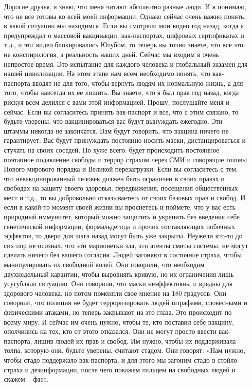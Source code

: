Дорогие друзья, я знаю, что меня читают абсолютно разные люди. И я понимаю, что не все готовы ко всей моей информации. Однако сейчас очень важно понять, в какой ситуации мы находимся. Если вы смотрели мои видео год назад, когда я предупреждал о массовой вакцинации, вак-паспортах, цифровых сертификатах и т.д., и эти видео блокировались Ютубом, то теперь вы точно знаете, что все это не конспирология, а реальность наших дней. 
Сейчас мы входим в очень непростое время. Это испытание для каждого человека и глобальный экзамен для нашей цивилизации.
На этом этапе нам всем необходимо понять, что вак-паспорта вводят не для того, чтобы вернуть людям их нормальную жизнь, а для того, чтобы навсегда их ее лишить.
Вы знаете, что я был прав год назад, когда рискуя всем делился с вами этой информацией. Прошу, послушайте меня и сейчас. 
Если вы согласитесь принять вак-паспорт и все, что с этим связано, то будьте уверены, что вакцинироваться вас будут вынуждать ежегодно. Эти штаммы никогда не закончатся. Вам будут говорить, что вакцина ничего не гарантирует. Вас будут принуждать постоянно носить маски, дистанцироваться и стучать на своих соседей. Но хуже всего: будет происходить постоянное поэтапное подавление свободы и террор страхом через СМИ и говорящие головы Нового мирового порядка и Великой перезагрузки. 
Если вы согласитесь с тем, что невакцинированный человек должен быть ограничен в своих правах и свободах на защиту своего здоровья, передвижения, посещения общественных мест и т.д., то вы добровольно отказываетесь от своих базовых прав и свобод. И если в какой-то момент своей жизни вы проснетесь и поймете, что у вас есть природный иммунитет, который можно защитить и укрепить без введения себе генетической информации, формальдегида и прочих составляющих побочных эффектов, то двери для шага назад могут быть уже закрыты.
Неужели кто-то до сих пор не осознал, что эти марионетки зла, эти агенты смиты системы, не могут сделать ничего без вашего согласия. Людей загоняют в состояние страха, чтобы манипулировать их свободной волей. 
Они говорили, что необходим двухнедельный карантин, чтобы выровнять кривую, но их ограничения лишь усугубляли ситуацию. Они говорили, что маски неэффективны и вредны для здорового человека, но потом поменяли свое мнение на 180 градусов. Они говорили, что полиция не будет терроризировать людей штрафами, словесными и физическими атаками, но теперь закрывают на это глаза. 
Это происходит по всему миру. И сейчас им очень нужно, чтобы те, кто поставил себе вакцину, ополчились на тех, кто от этого отказался. Они не могут просто ввести вак-паспорта, лишив людей их прав и свобод. Им нужно, чтобы их поддерживала толпа, которую они, будьте уверены, считают стадом. Они говорят: «Нам нужно, чтобы стадо поддержало вак-паспорта, и для этого мы загоним стадо в стойло страха и дезинформации, после чего покажем пальцем на свободных людей и скажем – фас».
